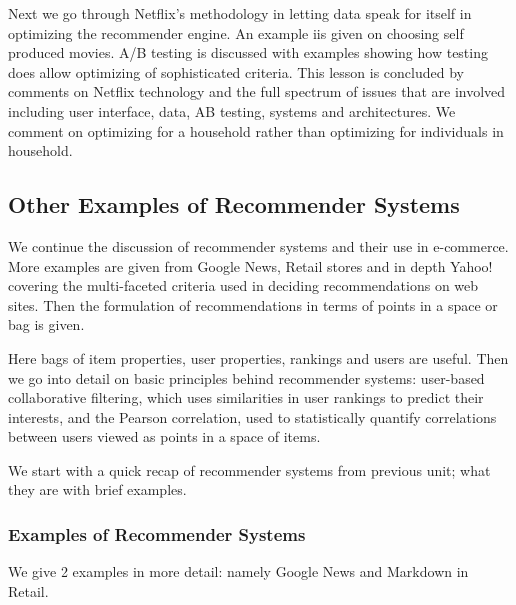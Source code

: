 Next we go through Netflix's methodology in letting data speak for
itself in optimizing the recommender engine. An example iis given on
choosing self produced movies. A/B testing is discussed with examples
showing how testing does allow optimizing of sophisticated criteria.
This lesson is concluded by comments on Netflix technology and the full
spectrum of issues that are involved including user interface, data, AB
testing, systems and architectures. We comment on optimizing for a
household rather than optimizing for individuals in household.




\subsection{Other Examples of Recommender Systems}

We continue the discussion of recommender systems and their use in
e-commerce. More examples are given from Google News, Retail stores and
in depth Yahoo! covering the multi-faceted criteria used in deciding
recommendations on web sites. Then the formulation of recommendations in
terms of points in a space or bag is given.

Here bags of item properties, user properties, rankings and users are
useful. Then we go into detail on basic principles behind recommender
systems: user-based collaborative filtering, which uses similarities in
user rankings to predict their interests, and the Pearson correlation,
used to statistically quantify correlations between users viewed as
points in a space of items.



We start with a quick recap of recommender systems from previous unit;
what they are with brief examples.


\subsubsection{Examples of Recommender Systems}

We give 2 examples in more detail: namely Google News and Markdown in
Retail.


